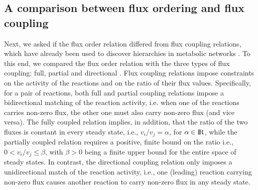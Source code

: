 \documentclass[12pt]{article}
\begin{document}
\subsection{A comparison between flux ordering and flux coupling}
Next, we asked if the flux order relation differed from flux coupling relations, which have already been used to discover hierarchies in metabolic networks \cite{Hosseini2015}. To this end, we compared the flux order relation with the three types of flux coupling: full, partial and directional \cite{Burgard2004a}. Flux coupling relations impose constraints on the activity of the reactions and on the ratio of their flux values. Specifically, for a pair of reactions, both full and partial coupling relations impose a bidirectional matching of the reaction activity, i.e. when one of the reactions carries non-zero flux, the other one must also carry non-zero flux (and vice versa). The fully coupled relation implies, in addition, that the ratio of the two fluxes is constant in every steady state, i.e., $v_i / v_j = \alpha$, for $\alpha \in \rm I\!R$, while the partially coupled relation requires a positive, finite bound on the ratio i.e., $0 < v_i / v_j \leq \beta$, with $\beta > 0$ being a finite upper bound for the entire space of steady states. In contrast, the directional coupling relation only imposes a unidirectional match of the reaction activity, i.e., one (leading) reaction carrying non-zero flux causes another reaction to carry non-zero flux in any steady state.

\begin{table}[]
\centering
{}
\caption{\small \textbf{Overlap between flux-ordered and flux-coupled reaction pairs}. Conditional probabilities between the sets of flux-ordered reaction pairs (O), the union of all three types of flux-coupled reaction pairs (C), directionally coupled (D), partially coupled (P) and fully coupled (F) pairs across the three carbon sources evaluated in this study. A majority of flux-ordered reaction pairs are not flux-coupled while most flux-coupled pairs are also flux-ordered, thus the flux order relation is not fully represented in all three coupling relations.}
\label{tab:couplings}
\end{table}
\end{document}
